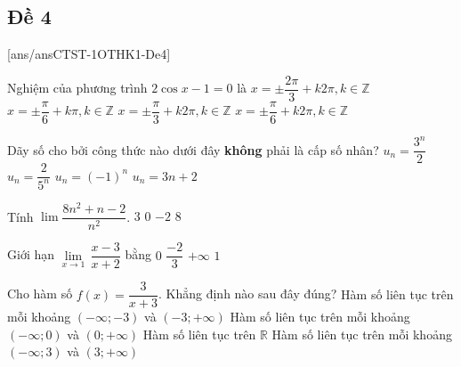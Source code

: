 \subsection{Đề 4}
\caulc
{}[ans/ansCTST-1OTHK1-De4]
\begin{ex}%
	Nghiệm của phương trình $2\cos x-1=0$ là
	\choice
	{$x=\pm \dfrac{2\pi}{3}+k2\pi,k\in \mathbb{Z}$}
	{$x=\pm \dfrac{\pi}{6}+k\pi,k\in \mathbb{Z}$}
	{\True $x=\pm \dfrac{\pi}{3}+k2\pi,k\in \mathbb{Z}$}
	{$x=\pm \dfrac{\pi}{6}+k2\pi,k\in \mathbb{Z}$}
\end{ex}
\begin{ex}%
	Dãy số cho bởi công thức nào dưới đây \textbf{không} phải là cấp số nhân?
	\choice
	{$u_n=\dfrac{3^n}{2}$}
	{$u_n=\dfrac{2}{5^n}$}
	{$u_n=\left(-1\right)^n$}
	{\True $u_n=3n+2$}
\end{ex}
\begin{ex}%
	Tính $\lim \dfrac{8n^2+n-2}{n^2}$.
	\choice
	{$3$}
	{$0$}
	{$-2$}
	{\True $8$}
\end{ex}
\begin{ex}%
	Giới hạn $\lim\limits_{x\to 1}\, \dfrac{x-3}{x+2}$ bằng
	\choice
	{$0$}
	{\True $\dfrac{-2}{3}$}
	{$+\infty $}
	{$1$}
\end{ex}
\begin{ex}%
	Cho hàm số $f(x)=\dfrac{3}{x+3}$. Khẳng định nào sau đây đúng?
	\choice
	{\True Hàm số liên tục trên mỗi khoảng $(-\infty;-3)$ và $(-3;+\infty)$}
	{Hàm số liên tục trên mỗi khoảng $(-\infty;0)$ và $(0;+\infty)$}
	{Hàm số liên tục trên $\mathbb{R}$}
	{Hàm số liên tục trên mỗi khoảng $(-\infty;3)$ và $(3;+\infty)$}
\end{ex}
